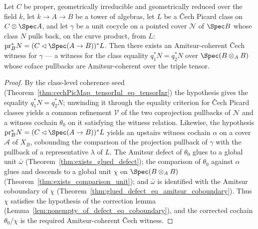 \begin{theorem}
  \label{thm:exists_coherentCechWitness}
  \leanok
  Let \(C\) be proper, geometrically irreducible and geometrically reduced over the field
  \(k\), let \(k \to A \to B\) be a tower of algebras, let \(L\) be a \v Cech Picard class on
  \(C \otimes \Spec A\), and let \(\gamma\) be a unit cocycle on a pointed cover \(\mathcal N\)
  of \(\Spec B\) whose class \(N\) pulls back, on the curve product, from \(L\):
  \(\mathrm{pr}_B^{*} N = (C \lhd \Spec(A \to B))^{*} L\). Then there exists an Amitsur-coherent
  \v Cech witness for \(\gamma\) — a witness for the class equality
  \(q_1^{*} N = q_2^{*} N\) over \(\Spec(B \otimes_A B)\) whose coface pullbacks are Amitsur-coherent
  over the triple tensor.
\end{theorem}
\begin{proof}
  \leanok
  By the class-level coherence seed (Theorem~\ref{thm:cechPicMap_tensorInl_eq_tensorInr}) the
  hypothesis gives the equality \(q_1^{*} N = q_2^{*} N\); unwinding it through the
  equality criterion for \v Cech Picard classes yields a common refinement \(\mathcal V\) of the
  two coprojection pullbacks of \(\mathcal N\) and a witness cochain \(\theta_0\) on it
  satisfying the witness relation. Likewise, the hypothesis
  \(\mathrm{pr}_B^{*} N = (C \lhd \Spec(A \to B))^{*} L\) yields an upstairs witness cochain
  \(\alpha\) on a cover \(\mathcal A\) of \(X_B\), cobounding the comparison of the projection
  pullback of \(\gamma\) with the pullback of a representative \(\lambda\) of \(L\).
  The Amitsur defect of \(\theta_0\) glues to a global unit \(\bar\omega\)
  (Theorem~\ref{thm:exists_glued_defect}); the comparison of \(\theta_0\) against
  \(\alpha\) glues and descends to a global unit \(\chi\) on \(\Spec(B \otimes_A B)\)
  (Theorem~\ref{thm:exists_comparison_unit}); and \(\bar\omega\) is identified
  with the Amitsur coboundary of \(\chi\) (Theorem~\ref{thm:glued_defect_eq_amitsur_coboundary}).
  Thus \(\chi\) satisfies the hypothesis of the correction lemma
  (Lemma~\ref{lem:nonempty_of_defect_eq_coboundary}), and the corrected cochain
  \(\theta_0/\chi\) is the required Amitsur-coherent \v Cech witness.
\end{proof}

